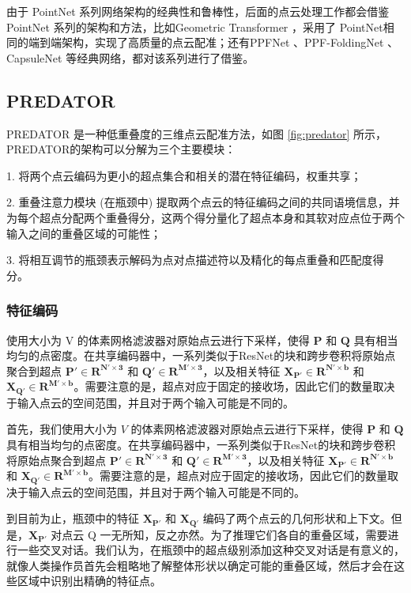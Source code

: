 由于 PointNet 系列网络架构的经典性和鲁棒性，后面的点云处理工作都会借鉴 PointNet 系列的架构和方法，比如Geometric Transformer\cite{qin2022geometric} ，采用了 PointNet相同的端到端架构，实现了高质量的点云配准；还有PPFNet\cite{deng2018ppf} 、PPF-FoldingNet\cite{deng2018ppfnet} 、CapsuleNet\cite{sabour2017dynamic} 等经典网络，都对该系列进行了借鉴。

\subsection{PREDATOR}
PREDATOR\cite{huang2021predator} 是一种低重叠度的三维点云配准方法，如图 \ref{fig:predator} 所示，PREDATOR的架构可以分解为三个主要模块：

1. 将两个点云编码为更小的超点集合和相关的潜在特征编码，权重共享；

2. 重叠注意力模块 (在瓶颈中) 提取两个点云的特征编码之间的共同语境信息，并为每个超点分配两个重叠得分，这两个得分量化了超点本身和其软对应点位于两个输入之间的重叠区域的可能性；

3. 将相互调节的瓶颈表示解码为点对点描述符以及精化的每点重叠和匹配度得分。

\subsubsection{特征编码}使用大小为 V 的体素网格滤波器对原始点云进行下采样，使得 $\boldsymbol{P}$ 和 $\boldsymbol{Q}$ 具有相当均匀的点密度。在共享编码器中，一系列类似于ResNet的块和跨步卷积将原始点聚合到超点 $\boldsymbol{P' \in R^{N' \times 3}}$ 和 $\boldsymbol{Q' \in R^{M' \times 3}}$，以及相关特征 $\boldsymbol{X_{P'} \in R^{N' \times b}}$ 和 $\boldsymbol{X_{Q'} \in R^{M' \times b}}$。需要注意的是，超点对应于固定的接收场，因此它们的数量取决于输入点云的空间范围，并且对于两个输入可能是不同的。

首先，我们使用大小为 $V$ 的体素网格滤波器对原始点云进行下采样，使得 $\boldsymbol{P}$ 和 $\boldsymbol{Q}$ 具有相当均匀的点密度。在共享编码器中，一系列类似于ResNet的块和跨步卷积将原始点聚合到超点 $\boldsymbol{P' \in R^{N' \times 3}}$ 和 $\boldsymbol{Q' \in R^{M' \times 3}}$，以及相关特征 $\boldsymbol{X_{P'} \in R^{N' \times b}}$ 和 $\boldsymbol{X_{Q'} \in R^{M' \times b}}$。需要注意的是，超点对应于固定的接收场，因此它们的数量取决于输入点云的空间范围，并且对于两个输入可能是不同的。

到目前为止，瓶颈中的特征 $\boldsymbol{X_{P'}}$ 和 $\boldsymbol{X_{Q'}}$ 编码了两个点云的几何形状和上下文。但是，$\boldsymbol{X_{P'}}$ 对点云 Q 一无所知，反之亦然。为了推理它们各自的重叠区域，需要进行一些交叉对话。我们认为，在瓶颈中的超点级别添加这种交叉对话是有意义的，就像人类操作员首先会粗略地了解整体形状以确定可能的重叠区域，然后才会在这些区域中识别出精确的特征点。


